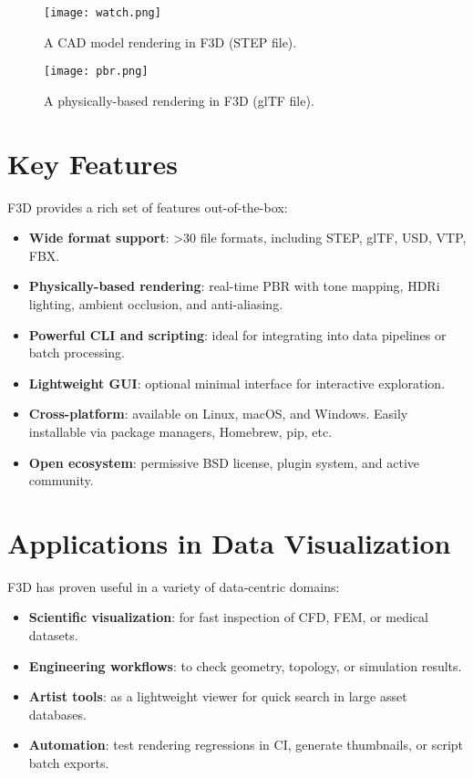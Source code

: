 \documentclass[10pt,journal,cspaper,compsoc]{journeevisu}
\begin{document}
\begin{figure}[h]
  \centering
  \texttt{[image: watch.png]}
  \caption{A CAD model rendering in F3D (STEP file).}
  \label{fig:watch}
\end{figure}

\begin{figure}[h]
  \centering
  \texttt{[image: pbr.png]}
  \caption{A physically-based rendering in F3D (glTF file).}
  \label{fig:pbr}
\end{figure}

\section{Key Features}

F3D provides a rich set of features out-of-the-box:
\begin{itemize}
    \item \textbf{Wide format support}: >30 file formats, including STEP, glTF, USD, VTP, FBX.
    \item \textbf{Physically-based rendering}: real-time PBR with tone mapping, HDRi lighting, ambient occlusion, and anti-aliasing.
    \item \textbf{Powerful CLI and scripting}: ideal for integrating into data pipelines or batch processing.
    \item \textbf{Lightweight GUI}: optional minimal interface for interactive exploration.
    \item \textbf{Cross-platform}: available on Linux, macOS, and Windows. Easily installable via package managers, Homebrew, pip, etc.
    \item \textbf{Open ecosystem}: permissive BSD license, plugin system, and active community.
\end{itemize}

\section{Applications in Data Visualization}

F3D has proven useful in a variety of data-centric domains:
\begin{itemize}
    \item \textbf{Scientific visualization}: for fast inspection of CFD, FEM, or medical datasets.
    \item \textbf{Engineering workflows}: to check geometry, topology, or simulation results.
    \item \textbf{Artist tools}: as a lightweight viewer for quick search in large asset databases.
    \item \textbf{Automation}: test rendering regressions in CI, generate thumbnails, or script batch exports.
\end{itemize}
\end{document}
